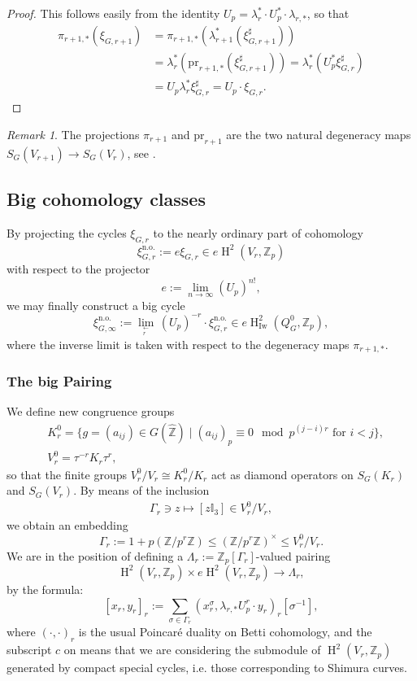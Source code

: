 \documentclass[12pt,a4paper,reqno]{amsart}
\theoremstyle{definition}
\numberwithin{definition}{subsection}
\theoremstyle{definition}
\numberwithin{Definition}{subsection}
\theoremstyle{remark}
\theoremstyle{remark}
\newtheorem{Remark}{Remark}
\numberwithin{Remark}{subsection}
\theoremstyle{remark}
\theoremstyle{plain}
\numberwithin{Theorem}{subsection}
\theoremstyle{plain}
\theoremstyle{plain}
\theoremstyle{plain}
\theoremstyle{plain}
\theoremstyle{plain}
\theoremstyle{plain}
\theoremstyle{plain}
\newcommand*{\Z}{\mathbb{Z}}
\DeclareMathOperator{\GL}{GL}
\DeclareMathOperator{\h}{H}
\begin{document}
\begin{proof}
This follows easily from the identity $U_p=\lambda_r^*\cdot U_p^*\cdot \lambda_{r,*}$, so that 
\begin{align*}
\pi_{r+1,*}(\xi_{G,r+1})&=\pi_{r+1,*}(\lambda_{r+1}^*(\xi_{G,r+1}^\sharp))\\
&=\lambda_r^*(\text{pr}_{r+1,*}(\xi_{G,r+1}^\sharp))=\lambda_r^*(U_p^*\xi_{G,r}^\sharp)\\
&=U_p\lambda_{r}^*  \xi_{G,r}^\sharp=U_p\cdot  \xi_{G,r}.
\end{align*}
\end{proof}

\begin{Remark}
The projections $\pi_{r+1}$ and $\text{pr}_{r+1}$ are the two natural degeneracy maps $S_{G}(V_{r+1})\to S_G(V_{r})$, see \cite[p. 44]{fornea}.
\end{Remark}
\subsection{Big cohomology classes}
\label{bgc}

By projecting the cycles $\xi_{G,r}$ to the nearly ordinary part of cohomology
\[
\xi_{G,r}^{\text{n.o.}}:=e\xi_{G,r}\in e\h^2(V_r,\Z_p)
\]
with respect to the projector
\[
e:=\lim_{n\to \infty} (U_p)^{n!},
\]
we may finally construct a big cycle
\[
\xi_{G,\infty}^{\text{n.o.}}:=\lim_{_{\substack{\leftarrow\\r}}}\,(U_p)^{-r}\!\cdot\xi_{G,r}^{\text{n.o.}}\in e\h_{\text{Iw}}^2(Q_G^0,\Z_p),
\]
where the inverse limit is taken with respect to the degeneracy maps $\pi_{r+1,*}$.

\subsubsection{The big Pairing}
We define new congruence groups
\begin{align*}
    &K_r^0=\{g=(a_{ij})\in G(\hat{\Z})\mid (a_{ij})_p\equiv 0 \mod p^{(j-i)r} \text{ for } i< j\},\\ &V^0_r=\tau^{-r}K_r\tau^r,
\end{align*}
so that the finite groups $V^0_r/V_r\cong K^0_r/K_r$ act as diamond operators on $S_{G}(K_r)$ and $S_{G}(V_r)$.
By means of the inclusion
\begin{align*}
    \Gamma_r\ni z\mapsto [z\mathbb{I}_{3}]\in V^0_r/V_r,
\end{align*}
we obtain an embedding $$\Gamma_r:=1+p(\Z/p^r\Z)\le (\Z/p^r\Z)^\times\le V^0_r/V_r.$$
We are in the position of defining a $\Lambda_r:=\Z_p[\Gamma_r]$-valued pairing 
\[
\h^2(V_r,\Z_p)\times e\h^2(V_r,\Z_p)\to \Lambda_r,
\]
by the formula:
\[
[x_r,y_r]_r:=\sum_{\sigma\in \Gamma_r}(x_r^\sigma,\lambda_{r,*}U_p^{r}\cdot y_r)_r[\sigma^{-1}],
\]
where $(\cdot,\cdot)_r$ is the usual Poincaré duality on Betti cohomology, and the subscript $c$ on  means that we are considering the submodule of $\h^2(V_r,\Z_p)$ generated by compact special cycles, i.e. those corresponding to Shimura curves.
\end{document}
